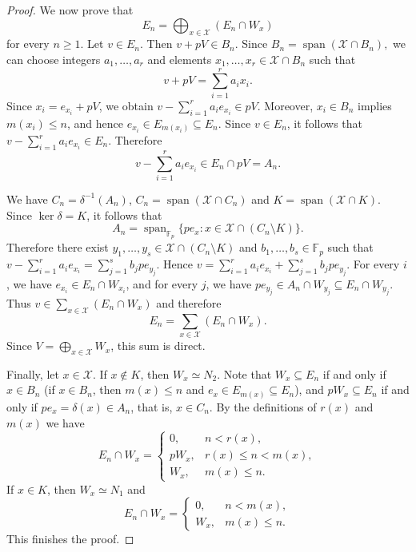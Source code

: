 \documentclass[11pt]{article}
\theoremstyle{definition}
\begin{document}
\begin{proof}
We now prove that
$$
E_n=\bigoplus_{x\in\mathcal X}(E_n\cap W_x)
$$
for every $n\geq1$. Let $v\in E_n$. Then $v+pV\in B_n$. Since $B_n=\operatorname{span}(\mathcal X\cap B_n),$
we can choose integers $a_1,\ldots,a_r$ and elements
$x_1,\ldots,x_r\in\mathcal X\cap B_n$ such that
$$
v+pV=\sum_{i=1}^r a_i x_i.
$$
Since $x_i=e_{x_i}+pV$, we obtain
$v-\sum_{i=1}^r a_i e_{x_i}\in pV.$
Moreover, $x_i\in B_n$ implies $m(x_i)\leq n$, and hence $e_{x_i}\in E_{m(x_i)}\subseteq E_n.$
Since $v\in E_n$, it follows that
$v-\sum_{i=1}^r a_i e_{x_i}\in E_n.$
Therefore
$$
v-\sum_{i=1}^r a_i e_{x_i}\in E_n\cap pV=A_n.
$$

We have $C_n=\delta^{-1}(A_n)$,
$
C_n=\operatorname{span}(\mathcal X\cap C_n)$ and
$K=\operatorname{span}(\mathcal X\cap K).$
Since $\ker\delta=K$, it follows that
$$
A_n=\operatorname{span}_{\mathbb F_p}
\{pe_x:x\in\mathcal X\cap(C_n\setminus K)\}.
$$
Therefore there exist $y_1,\ldots,y_s\in
\mathcal X\cap(C_n\setminus K)$ and $b_1,\ldots,b_s\in\mathbb F_p$
such that
$
v-\sum_{i=1}^r a_i e_{x_i}
=
\sum_{j=1}^s b_jpe_{y_j}.
$
Hence
$
v=
\sum_{i=1}^r a_i e_{x_i}
+
\sum_{j=1}^s b_jpe_{y_j}.
$ For every $i$, we have $e_{x_i}\in E_n\cap W_{x_i}$,
and for every $j$, we have
$pe_{y_j}\in A_n\cap W_{y_j}\subseteq E_n\cap W_{y_j}$.
Thus $v\in\sum_{x\in\mathcal X}(E_n\cap W_x)$
and therefore
$$
E_n=\sum_{x\in\mathcal X}(E_n\cap W_x).
$$
Since $V=\bigoplus_{x\in\mathcal X}W_x$, this sum is direct.

Finally, let $x\in\mathcal X$. If $x\notin K$, then $W_x\simeq N_2$.
Note that $W_x\subseteq E_n$ if and only if $x\in B_n$
(if $x\in B_n$, then $m(x)\leq n$ and $e_x\in E_{m(x)}\subseteq E_n$),
and $pW_x\subseteq E_n$ if and only if $pe_x=\delta(x)\in A_n$,
that is, $x\in C_n$.
By the definitions of $r(x)$ and $m(x)$ we have
$$
E_n\cap W_x=
\begin{cases}
	0,&n<r(x),\\
	pW_x,&r(x)\leq n<m(x),\\
	W_x,&m(x)\leq n.
\end{cases}
$$
If $x\in K$, then $W_x\simeq N_1$ and
$$
E_n\cap W_x=
\begin{cases}
	0,&n<m(x),\\
	W_x,&m(x)\leq n.
\end{cases}
$$
This finishes the proof.
\end{proof}
\end{document}
